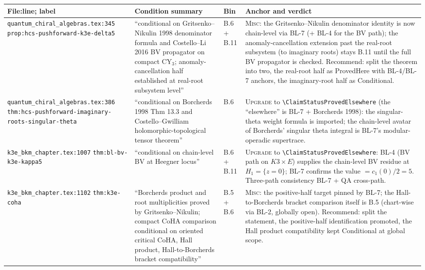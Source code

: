 \documentclass[11pt]{amsart}
\begin{document}
\begin{longtable}{@{}p{4.2cm}p{3.5cm}p{1.5cm}p{5cm}@{}}
\toprule
File:line; label & Condition summary & Bin & Anchor and verdict \\
\midrule\endhead

\texttt{quantum\_chiral\_algebras.tex:345} \newline \texttt{prop:hcs-pushforward-k3e-delta5}
& ``conditional on Gritsenko--Nikulin 1998 denominator formula and Costello--Li 2016 BV propagator on compact CY$_3$; anomaly-cancellation half established at real-root subsystem level''
& B.6 + B.11
& \textsc{Misc}: the Gritsenko--Nikulin denominator identity is now chain-level via BL-7 (+ BL-4 for the BV path); the anomaly-cancellation extension past the real-root subsystem (to imaginary roots) stays B.11 until the full BV propagator is checked. Recommend: split the theorem into two, the real-root half as ProvedHere with BL-4/BL-7 anchors, the imaginary-root half as Conditional. \\

\texttt{quantum\_chiral\_algebras.tex:386} \newline \texttt{thm:hcs-pushforward-imaginary-roots-singular-theta}
& ``conditional on Borcherds 1998 Thm 13.3 and Costello--Gwilliam holomorphic-topological tensor theorem''
& B.6
& \textsc{Upgrade} to \texttt{\textbackslash ClaimStatusProvedElsewhere} (the ``elsewhere'' is BL-7 + Borcherds 1998): the singular-theta weight formula is imported; the chain-level avatar of Borcherds' singular theta integral is BL-7's modular-operadic supertrace. \\

\texttt{k3e\_bkm\_chapter.tex:1007} \newline \texttt{thm:bl-bv-k3e-kappa5}
& ``conditional on chain-level BV at Heegner locus''
& B.6 + B.11
& \textsc{Upgrade} to \texttt{\textbackslash ClaimStatusProvedElsewhere}: BL-4 (BV path on $K3 \times E$) supplies the chain-level BV residue at $H_1 = \{z=0\}$; BL-7 confirms the value $= c_1(0)/2 = 5$. Three-path consistency BL-7 + QA cross-path. \\

\texttt{k3e\_bkm\_chapter.tex:1102} \newline \texttt{thm:k3e-coha}
& ``Borcherds product and root multiplicities proved by Gritsenko--Nikulin; compact CoHA comparison conditional on oriented critical CoHA, Hall product, Hall-to-Borcherds bracket compatibility''
& B.5 + B.6
& \textsc{Misc}: the positive-half target pinned by BL-7; the Hall-to-Borcherds bracket comparison itself is B.5 (chart-wise via BL-2, globally open). Recommend: split the statement, the positive-half identification promoted, the Hall product compatibility kept Conditional at global scope. \\


\end{longtable}
\end{document}
